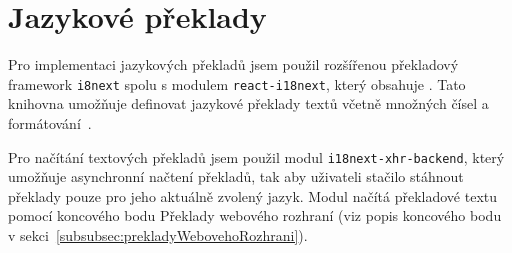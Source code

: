 
\section{Jazykové překlady}\label{sec:jazykovéPřeklady}

Pro implementaci jazykových překladů jsem použil rozšířenou překladový framework \texttt{i8next} spolu s modulem \texttt{react-i18next}, který obsahuje .
Tato knihovna umožňuje definovat jazykové překlady textů včetně množných čísel a formátování~\cite{i8next:docs}.

Pro načítání textových překladů jsem použil modul \texttt{i18next-xhr-backend}, který umožňuje asynchronní načtení překladů, tak aby uživateli stačilo stáhnout překlady pouze pro jeho aktuálně zvolený jazyk.
Modul načítá překladové textu pomocí koncového bodu Překlady webového rozhraní (viz popis koncového bodu v sekci~\ref{subsubsec:prekladyWebovehoRozhrani}).

